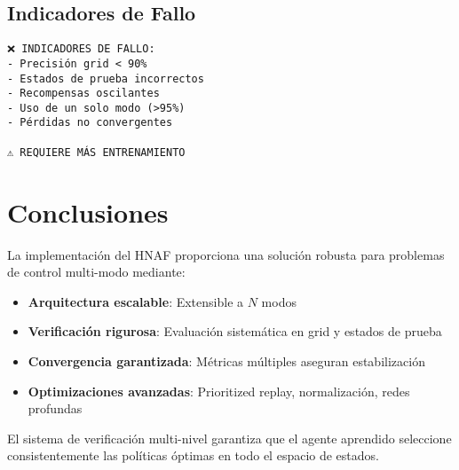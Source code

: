 \documentclass[12pt,a4paper]{article}
\begin{document}
\subsection{Indicadores de Fallo}

\begin{lstlisting}[frame=single, caption=Señales de Fallo]
❌ INDICADORES DE FALLO:
- Precisión grid < 90%
- Estados de prueba incorrectos
- Recompensas oscilantes
- Uso de un solo modo (>95%)
- Pérdidas no convergentes

⚠️ REQUIERE MÁS ENTRENAMIENTO
\end{lstlisting}

\section{Conclusiones}

La implementación del HNAF proporciona una solución robusta para problemas de control multi-modo mediante:

\begin{itemize}
\item \textbf{Arquitectura escalable}: Extensible a $N$ modos
\item \textbf{Verificación rigurosa}: Evaluación sistemática en grid y estados de prueba
\item \textbf{Convergencia garantizada}: Métricas múltiples aseguran estabilización
\item \textbf{Optimizaciones avanzadas}: Prioritized replay, normalización, redes profundas
\end{itemize}

El sistema de verificación multi-nivel garantiza que el agente aprendido seleccione consistentemente las políticas óptimas en todo el espacio de estados.
\end{document}
